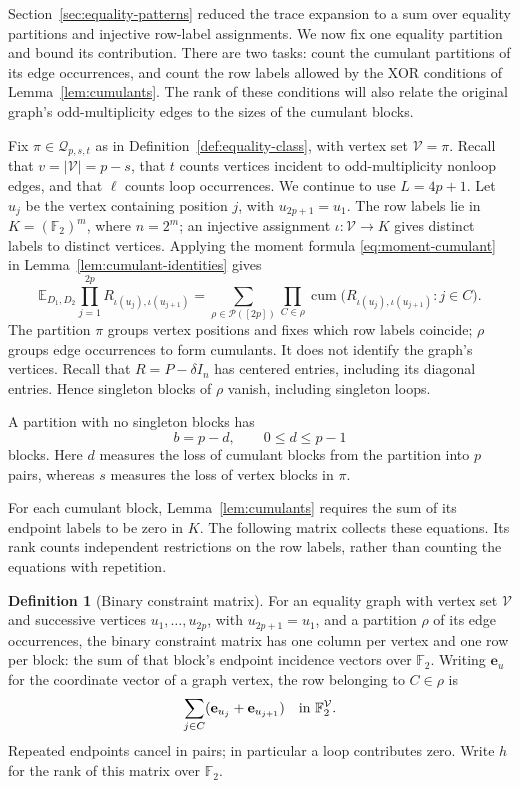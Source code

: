 \documentclass[11pt]{article}
\theoremstyle{definition}
\newtheorem{definition}{Definition}[section]
\theoremstyle{remark}
\theoremstyle{plain}
\newcommand{\E}{\mathbb E}
\newcommand{\F}{\mathbb F}
\DeclareMathOperator{\cum}{cum}
\begin{document}
Section~\ref{sec:equality-patterns} reduced the trace expansion to a
sum over equality partitions and injective row-label assignments.
We now fix one equality partition and bound its contribution. There
are two tasks: count the cumulant partitions of its edge occurrences,
and count the row labels allowed by the XOR conditions of
Lemma~\ref{lem:cumulants}. The rank of these conditions will also
relate the original graph's odd-multiplicity edges to the sizes
of the cumulant blocks.

Fix $\pi\in\mathcal Q_{p,s,t}$ as in
Definition~\ref{def:equality-class}, with vertex set $\mathcal V=\pi$.
Recall that $v=|\mathcal V|=p-s$, that $t$ counts vertices incident
to odd-multiplicity nonloop edges, and that $\ell$ counts loop
occurrences. We continue to use $L=4p+1$.
Let $u_j$ be the vertex containing position $j$, with $u_{2p+1}=u_1$.
The row labels lie in $K=(\F_2)^m$, where $n=2^m$; an injective
assignment $\iota:\mathcal V\to K$ gives distinct labels to distinct
vertices. Applying the moment formula \eqref{eq:moment-cumulant}
in Lemma~\ref{lem:cumulant-identities} gives
\begin{equation}\label{eq:entry-moment-expansion}
 \E_{D_1,D_2}\prod_{j=1}^{2p}R_{\iota(u_j),\iota(u_{j+1})}
   =\sum_{\rho\in\mathcal P([2p])}
      \prod_{C\in\rho}
        \cum\bigl(R_{\iota(u_j),\iota(u_{j+1})}:j\in C\bigr).
\end{equation}
The partition $\pi$ groups vertex positions and fixes which row
labels coincide; $\rho$ groups edge occurrences to form cumulants.
It does not identify the graph's vertices. Recall that
$R=P-\delta I_n$ has centered entries, including its diagonal
entries. Hence singleton blocks of $\rho$ vanish, including singleton
loops.

\begin{samepage}
A partition with no singleton blocks has
\[
                         b=p-d,\qquad 0\le d\le p-1
\]
blocks. Here $d$ measures the loss of cumulant blocks from the
partition into $p$ pairs, whereas $s$ measures the loss of vertex
blocks in $\pi$.
\end{samepage}

For each cumulant block, Lemma~\ref{lem:cumulants} requires the sum
of its endpoint labels to be zero in $K$. The following matrix
collects these equations. Its rank counts independent restrictions
on the row labels, rather than counting the equations with repetition.

\begin{definition}[Binary constraint matrix]\label{def:binary-constraint}
For an equality graph with vertex set $\mathcal V$ and successive
vertices $u_1,\ldots,u_{2p}$, with $u_{2p+1}=u_1$, and a
partition $\rho$ of its edge
occurrences, the binary constraint matrix has one column per vertex
and one row per block: the
sum of that block's endpoint incidence vectors over \(\F_2\).
Writing $\mathbf e_u$ for the coordinate vector of a graph vertex,
the row belonging to $C\in\rho$ is
\[
 \sum_{j\in C}(\mathbf e_{u_j}+\mathbf e_{u_{j+1}})
                       \quad\hbox{in }\F_2^{\mathcal V}.
\]
Repeated endpoints cancel in pairs; in particular a loop
contributes zero. Write $h$ for the rank of this matrix over $\F_2$.
\end{definition}
\end{document}
